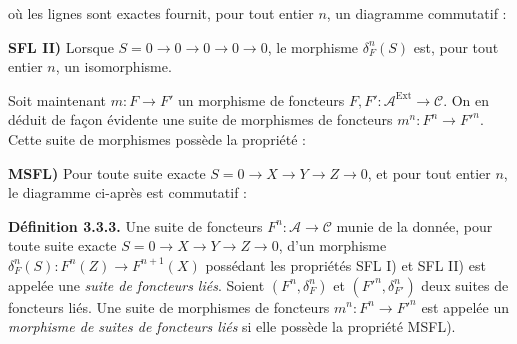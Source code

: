 \clearpage
{}%
\begingroup\small\setlength{\parskip}{0pt}\setlength{\emergencystretch}{1.5em}
\setlength{\abovedisplayskip}{4pt plus 2pt minus 2pt}%
\setlength{\belowdisplayskip}{4pt plus 2pt minus 2pt}%

où les lignes sont exactes fournit, pour tout entier $n$, un diagramme
commutatif :
\begin{center}
\end{center}

\noindent\textbf{SFL II)} Lorsque
$S=0\longrightarrow0\longrightarrow0\longrightarrow0\longrightarrow0$,
le morphisme $\delta_F^n(S)$ est, pour tout entier $n$, un isomorphisme.

Soit maintenant $m\colon F\longrightarrow F'$ un morphisme de foncteurs
$F,F'\colon\mathcal A^{\operatorname{Ext}}\longrightarrow\mathcal C$.
On en déduit de façon évidente une suite de morphismes de foncteurs
$m^n\colon F^n\longrightarrow {F'}^n$. Cette suite de morphismes possède la
propriété :

\noindent\textbf{MSFL)} Pour toute suite exacte
$S=0\longrightarrow X\longrightarrow Y\longrightarrow Z\longrightarrow0$,
et pour tout entier $n$, le diagramme ci-après est commutatif :

\begin{center}
\end{center}

\medskip\noindent\textbf{Définition 3.3.3.}\quad
Une suite de foncteurs $F^n\colon\mathcal A\longrightarrow\mathcal C$ munie
de la donnée, pour toute suite exacte
$S=0\longrightarrow X\longrightarrow Y\longrightarrow Z\longrightarrow0$,
d'un morphisme
$\delta_F^n(S)\colon F^n(Z)\longrightarrow F^{n+1}(X)$ possédant les
propriétés SFL I) et SFL II) est appelée une \emph{suite de foncteurs liés}.
Soient $(F^n,\delta_F^n)$ et $({F'}^n,\delta_{F'}^n)$ deux suites de
foncteurs liés. Une suite de morphismes de foncteurs
$m^n\colon F^n\longrightarrow {F'}^n$ est appelée un \emph{morphisme de
suites de foncteurs liés} si elle possède la propriété MSFL).


